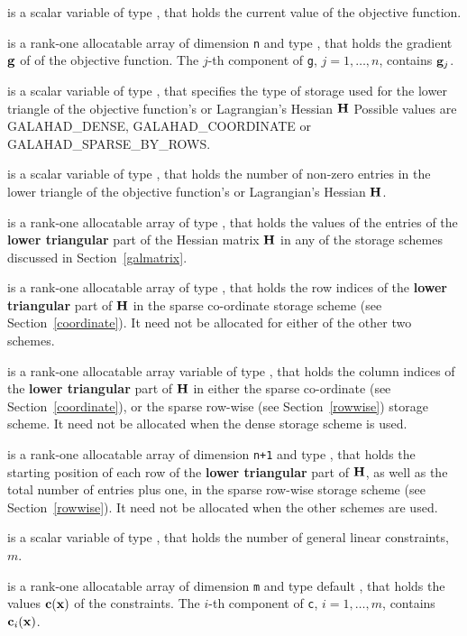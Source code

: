 \documentclass{galahad}
\newcommand{\sym}{\sf\small}
\begin{document}
\begin{description}
 is a scalar variable of type \realdp,
that holds the current value of the objective function.

 is a rank-one allocatable array of dimension {\tt n} and type 
\realdp, that holds the gradient ${\mathbf{g}}$ 
of of the objective function.
The $j$-th component of 
{\tt g}, $j = 1,  \ldots ,  n$, contains ${\mathbf{g}}_{j}$.

 is a scalar variable of type \integer, 
that specifies the type of storage used for the lower triangle of the 
objective function's or Lagrangian's Hessian ${\mathbf{H}}$
Possible values are {\sym GALAHAD\_DENSE}, {\sym GALAHAD\_COORDINATE} 
or {\sym GALAHAD\_SPARSE\_BY\_ROWS}.

 is a scalar variable of type \integer, 
that holds the number of non-zero entries in the lower triangle of the
objective function's or Lagrangian's Hessian ${\mathbf{H}}$.

 is a rank-one allocatable array of type \realdp, that holds
the values of the entries of the {\bf lower triangular} part
of the Hessian matrix ${\mathbf{H}}$ in any of the 
storage schemes discussed in Section~\ref{galmatrix}.

 is a rank-one allocatable array of type \integer,
that holds the row indices of the {\bf lower triangular} part of ${\mathbf{H}}$ 
in the sparse co-ordinate storage
scheme (see Section~\ref{coordinate}). 
It need not be allocated for either of the other two schemes.

 is a rank-one allocatable array variable of type \integer,
that holds the column indices of the {\bf lower triangular} part of 
${\mathbf{H}}$ in either the sparse co-ordinate 
(see Section~\ref{coordinate}), or the sparse row-wise 
(see Section~\ref{rowwise}) storage scheme.
It need not be allocated when the dense storage scheme is used.

 is a rank-one allocatable array of dimension {\tt n+1} and type 
\integer, that holds the starting position of 
each row of the {\bf lower triangular} part of ${\mathbf{H}}$, as well
as the total number of entries plus one, in the sparse row-wise storage
scheme (see Section~\ref{rowwise}). It need not be allocated when the
other schemes are used.

 is a scalar variable of type \integer, 
 that holds the number of general linear constraints, $m$.

 is a rank-one allocatable array of dimension {\tt m} and type default 
\realdp, that holds
the values ${\mathbf{c}}({\mathbf{x}} )$ of the constraints.
The $i$-th component of {\tt c}, $i = 1,  \ldots ,  m$, contains 
${\mathbf{c}}_{i}({\mathbf{x}})$.  


\end{description}
\end{document}
